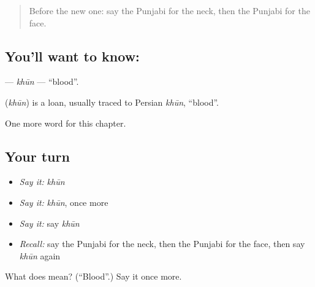 \label{lesson:PA-C50-khun}



\begin{quote}
Before the new one: say the Punjabi for the neck, then the Punjabi for the face.
\end{quote}

\subsection*{You'll want to know: }
\textbf{} — \emph{khūn} — \textquotedblleft{}blood\textquotedblright{}.

\begin{cousinweb}
\textbf{} (\emph{khūn}) is a loan, usually traced to Persian \emph{khūn}, \textquotedblleft{}blood\textquotedblright{}.
\end{cousinweb}

\begin{grammarlens}[title={What you've built}]
One more word for this chapter.
\end{grammarlens}

\subsection*{Your turn}
\begin{itemize}
\raggedright
  \item \emph{Say it:} \emph{khūn}
  \item \emph{Say it:} \emph{khūn}, once more
  \item \emph{Say it:} say \emph{khūn}
  \item \emph{Recall:} say the Punjabi for the neck, then the Punjabi for the face, then say \emph{khūn} again
\end{itemize}

\begin{tcolorbox}[breakable,colback=teal!4,colframe=teal!35!black,title={Before you move on}]
What does  mean? (\textquotedblleft{}Blood\textquotedblright{}.) Say it once more.
\end{tcolorbox}

